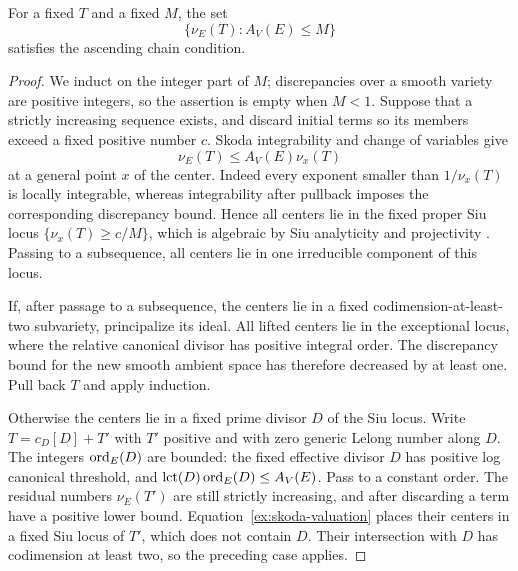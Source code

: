 \begin{lemma}\label{ex:valuation-acc}
For a fixed \(T\) and a fixed \(M\), the set
\[
 \{\nu_E(T): A_V(E)\leq M\}
\]
satisfies the ascending chain condition.
\end{lemma}
\begin{proof}
We induct on the integer part of \(M\); discrepancies over a
smooth variety are positive integers, so the assertion is empty
when \(M<1\). Suppose that a strictly
increasing sequence exists, and discard initial terms so its
members exceed a fixed positive number \(c\).
Skoda integrability and change of variables give
\begin{equation}\label{ex:skoda-valuation}
 \nu_E(T)\leq A_V(E)\nu_x(T)
\end{equation}
at a general point \(x\) of the center. Indeed every exponent
smaller than \(1/\nu_x(T)\) is locally integrable, whereas
integrability after pullback imposes the corresponding
discrepancy bound. Hence all centers lie in the fixed proper Siu
locus \(\{\nu_x(T)\geq c/M\}\), which is algebraic by Siu
analyticity and projectivity \cite{Siu1974}. Passing to a
subsequence, all centers lie in one irreducible component of
this locus.

If, after passage to a subsequence, the centers lie in a fixed
codimension-at-least-two subvariety, principalize its ideal.
All lifted centers lie in the exceptional locus, where the
relative canonical divisor has positive integral order.
The discrepancy bound for the new smooth ambient space has
therefore decreased by at least one. Pull back \(T\) and apply
induction.

Otherwise the centers lie in a fixed prime divisor \(D\) of the
Siu locus. Write \(T=c_D[D]+T'\) with \(T'\) positive and with
zero generic Lelong number along \(D\). The integers
\(\operatorname{ord}_E(D)\) are bounded: the fixed effective divisor \(D\) has
positive log canonical threshold, and
\(\operatorname{lct}(D)\operatorname{ord}_E(D)\leq A_V(E)\).
Pass to a constant order. The residual numbers \(\nu_E(T')\)
are still strictly increasing, and after discarding a term have
a positive lower bound. Equation~\eqref{ex:skoda-valuation}
places their centers in a fixed Siu locus of \(T'\), which does
not contain \(D\). Their intersection with \(D\) has codimension
at least two, so the preceding case applies.
\end{proof}

